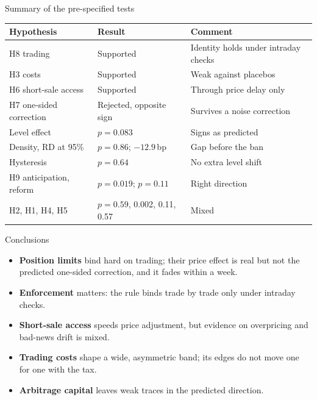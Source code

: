 \documentclass[11pt]{beamer}
\newcommand{\bp}{\,bp}
\begin{document}
\begin{frame}{Summary of the pre-specified tests}
  \begin{table}
    \scriptsize
    \begin{tabular}{@{}p{3.6cm}p{3.0cm}p{3.6cm}@{}}
      \toprule
      Hypothesis & Result & Comment \\
      \midrule
      H8 trading & \textcolor{okgreen}{Supported} & Identity holds under intraday checks \\
      H3 costs & \textcolor{okgreen}{Supported} & Weak against placebos \\
      H6 short-sale access & \textcolor{okgreen}{Supported} & Through price delay only \\
      H7 one-sided correction & \textcolor{alertred}{Rejected, opposite sign} & Survives a noise correction \\
      \midrule
      Level effect & $p=0.083$ & Signs as predicted \\
      Density, RD at 95\% & $p=0.86$; $-12.9$\bp & Gap before the ban \\
      Hysteresis & $p=0.64$ & No extra level shift \\
      H9 anticipation, reform & $p=0.019$; $p=0.11$ & Right direction \\
      H2, H1, H4, H5 & $p=0.59$, 0.002, 0.11, 0.57 & Mixed \\
      \bottomrule
    \end{tabular}
  \end{table}
\end{frame}

\begin{frame}{Conclusions}
  \begin{itemize}
    \item \textbf{Position limits} bind hard on trading; their price effect is real but not the predicted one-sided
    correction, and it fades within a week.
    \item \textbf{Enforcement} matters: the rule binds trade by trade only under intraday checks.
    \item \textbf{Short-sale access} speeds price adjustment, but evidence on overpricing and bad-news drift is mixed.
    \item \textbf{Trading costs} shape a wide, asymmetric band; its edges do not move one for one with the tax.
    \item \textbf{Arbitrage capital} leaves weak traces in the predicted direction.
  \end{itemize}
\end{frame}
\end{document}
